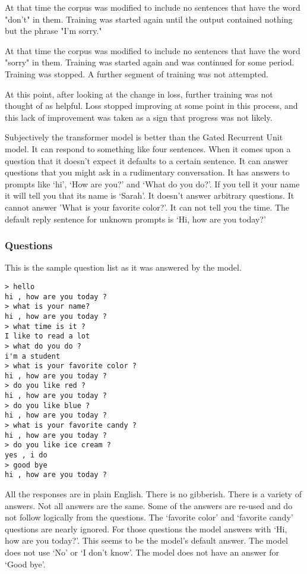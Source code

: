 At that time the corpus was modified to include no 
sentences that have the word "don't" in them. Training was started again until the output contained nothing but the phrase "I'm sorry." 

At that time the corpus was modified to include no sentences that have the word "sorry" in them. Training was started again and was continued for some period. Training was stopped. A further segment of training was not attempted. 

At this point, after looking at the change in loss, further training was not thought of as helpful. Loss stopped improving at some point in this process, and this lack of improvement was taken as a sign that progress was not likely.

Subjectively the transformer model is better than the Gated Recurrent Unit model. It can respond to something like four sentences. When it comes upon a question that it doesn't expect it defaults to a certain sentence. It can answer questions that you might ask in a rudimentary conversation. It has answers to prompts like `hi', `How are you?' and `What do you do?'. If you tell it your name it will tell you that its name is `Sarah'. It doesn't answer arbitrary questions. It cannot answer 'What is your favorite color?'. It can not tell you the time. The default reply sentence for unknown prompts is `Hi, how are you today?'


\subsubsection*{Questions}
This is the sample question list as it was answered by the model.

\begin{verbatim}
> hello
hi , how are you today ?
> what is your name?
hi , how are you today ?
> what time is it ?
I like to read a lot
> what do you do ?
i'm a student
> what is your favorite color ?
hi , how are you today ?
> do you like red ?
hi , how are you today ?
> do you like blue ?
hi , how are you today ?
> what is your favorite candy ?
hi , how are you today ?
> do you like ice cream ?
yes , i do 
> good bye
hi , how are you today ?
\end{verbatim}

All the responses are in plain English. There is no gibberish. There is a variety of answers. Not all answers are the same. Some of the answers are re-used and do not follow logically from the questions. The `favorite color' and `favorite candy' questions are nearly ignored. For those questions the model answers with `Hi, how are you today?'. This seems to be the model's default answer. The model does not use `No' or `I don't know'. The model does not have an answer for `Good bye'.

